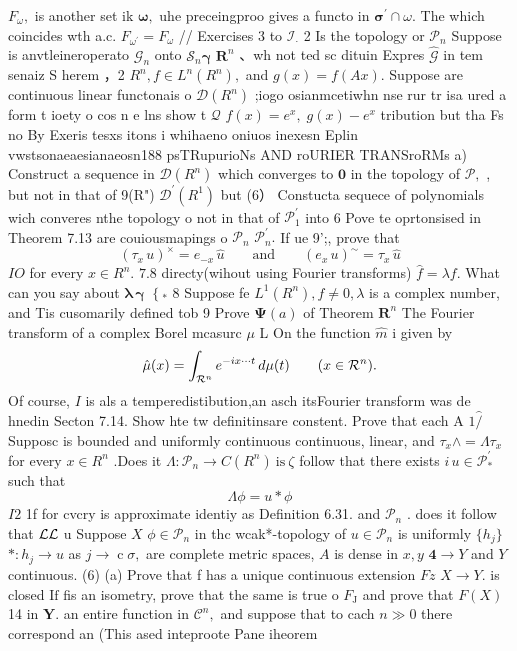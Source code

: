 $F_{\omega},$ is another set ik ${\boldsymbol{\omega}},$ uhe preceingproo gives a functo in ${\boldsymbol{\sigma}}^{\prime}\cap\omega.$ The which coincides wth a.c. $F_{\omega^{\prime}}=F_{\omega}$ // Exercises 3 to ${\mathcal{I}}_{\cdot}$ 2 Is the topology or ${\mathcal{P}}_{n}$ Suppose is anvtleineroperato ${\mathcal{G}}_{n}$ onto ${\mathcal{S}}_{n}{\boldsymbol{\gamma}}$ ${\boldsymbol{R}}^{n}$ 、wh not ted sc dituin Expres $\hat{\mathcal{G}}$ in tem senaiz S herem ，2 $R^{n},f\in L^{n}(R^{n}),$ and $g(x)=f(A x).$ Suppose are continuous linear functonais o ${\mathcal{D}}(R^{n})$ ;iogo osianmcetiwhn nse rur tr isa ured a form t ioety o cos n e lns show t $\scriptstyle{\mathcal{Q}}$ $f(x)=e^{x},\;g(x)-e^{x}$ tribution but tha Fs no By Exeris tesxs itons i whihaeno oniuos inexesn Eplin vwstsonaeaesianaeosn188 psTRupurioNs AND roURIER TRANSroRMs a) Construct a sequence in ${\mathcal{D}}(R^{n})$ which converges to $\mathbf{0}$ in the topology of ${\mathcal{P}},$ , but not in that of 9(R") ${\mathcal{D}}^{\prime}(R^{1})$ but (6） Constucta sequece of polynomials wich converes nthe topology o not in that of ${\mathcal{P}}_{1}^{\prime}$ into 6 Pove te oprtonsised in Theorem 7.13 are couiousmapings o ${\mathcal{P}}_{n}$ ${\mathcal{P}}_{n}^{\prime}.$ If ue 9';, prove that $$ (\tau_{x}\,u)^{\times}=e_{-x}\,{\hat{u}}\qquad{\mathrm{and}}\qquad(e_{x}\,u)^{\sim}=\tau_{x}\,{\hat{u}} $$ $I O$ for every $x\in R^{n}.$ $7.8$ directy(wihout using Fourier transforms) ${\hat{f}}=\lambda f.$ What can you say about ${\boldsymbol{\lambda}}\,{\boldsymbol{\gamma}}$ $\left\{_{*}\right.$ 8 Suppose fe $L^{1}(R^{n}),f\neq0,\lambda$ is a complex number, and Tis cusomarily defined tob 9 Prove $\mathbf{\Psi}(a)$ of Theorem ${\boldsymbol{R}}^{n}$ The Fourier transform of a complex Borel mcasurc ${\mu}$ L On the function ${\hat{m}}$ i given by $$ {\hat{\mu}}(x)=\int_{{\cal R}^{n}}e^{-i x\cdot\cdot\cdot t}\,d\mu(t)\qquad(x\in{\cal R}^{n}). $$ Of course, $\boldsymbol{\mathit{I}}$ is als a temperedistibution,an asch itsFourier transform was de hnedin Secton 7.14. Show hte tw definitinsare constent. Prove that each A ${\boldsymbol{\mathit{1}}}\mathbf{\widehat{/}}$ Supposc is bounded and uniformly continuous continuous, linear, and $\tau_{x}\wedge=\Lambda\tau_{x}$ for every $x\in R^{n}$ .Does it $\Lambda\colon{\mathcal{P}}_{n}\to C(R^{n}){\mathrm{~is~}}\zeta$ follow that there exists $i\,u\in{\mathcal{P}}_{*}^{\prime}$ such that $$ \Lambda\phi=u*\phi $$ ${\mathit{I}}{\mathit{2}}$ 1f for cvcry is approximate identiy as Definition 6.31. and ${\mathcal{P}}_{n}$ . does it follow that ${\cal{L}}{\cal{L}}$ u Suppose $\textstyle X$ $\phi\in{\mathcal{P}}_{n}$ in thc wcak*-topology of $u\in{\mathcal{P}}_{n}$ is uniformly $\{h_{j}\}$ $*:h_{j}\to u$ as $j\to\operatorname{c}\sigma,$ are complete metric spaces, $\scriptstyle A$ is dense in $x,y$ ${\boldsymbol{4}}\to Y$ and ${\mathbf{}}Y$ continuous. (6) (a) Prove that f has a unique continuous extension $F{\dot{z}}$ $X\to Y.$ is closed $\mathrm{If}$ fis an isometry, prove that the same is true o $F_{\mathrm{{J}}}$ and prove that $\scriptstyle{F(X)}$ 14 in ${\boldsymbol{Y}}.$ an entire function in ${\mathcal{C}}^{n},$ and suppose that to cach $\scriptstyle{n\gg0}$ there correspond an (This ased inteproote Pane iheorem 